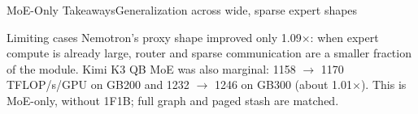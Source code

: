\documentclass[aspectratio=169,10pt]{beamer}
\renewcommand{\NvidiaSource}[1]{}
\begin{document}
\begin{frame}{MoE-Only Takeaways}{Generalization across wide, sparse expert shapes}
  \NvidiaSource{\texttt{moe\_perf\_canonical\_matrix\_20260730/README.md}}
  \noindent
  \hfill
  \hfill
  \vspace{.16in}
  \begin{NvidiaEvidence}{Limiting cases}
    Nemotron's proxy shape improved only 1.09$\times$: when expert compute is already large,
    router and sparse communication are a smaller fraction of the module.
    Kimi K3 QB MoE was also marginal: 1158 $\rightarrow$ 1170 TFLOP/s/GPU on GB200 and
    1232 $\rightarrow$ 1246 on GB300 (about 1.01$\times$). This is MoE-only, without 1F1B;
    full graph and paged stash are matched.
  \end{NvidiaEvidence}
\end{frame}
\end{document}
